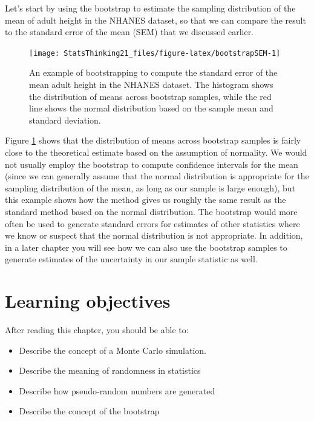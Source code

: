 \documentclass[12pt,]{book}
\providecommand{\tightlist}{%
  \setlength{\itemsep}{0pt}\setlength{\parskip}{0pt}}
\theoremstyle{definition}
\theoremstyle{definition}
\theoremstyle{definition}
\theoremstyle{remark}
\begin{document}
Let's start by using the bootstrap to estimate the sampling distribution of the mean of adult height in the NHANES dataset, so that we can compare the result to the standard error of the mean (SEM) that we discussed earlier.

\begin{figure}
\texttt{[image: StatsThinking21\_files/figure-latex/bootstrapSEM-1]} \caption{An example of bootstrapping to compute the standard error of the mean adult height in the NHANES dataset. The histogram shows the distribution of means across bootstrap samples, while the red line shows the normal distribution based on the sample mean and standard deviation.}\label{fig:bootstrapSEM}
\end{figure}

Figure \ref{fig:bootstrapSEM} shows that the distribution of means across bootstrap samples is fairly close to the theoretical estimate based on the assumption of normality. We would not usually employ the bootstrap to compute confidence intervals for the mean (since we can generally assume that the normal distribution is appropriate for the sampling distribution of the mean, as long as our sample is large enough), but this example shows how the method gives us roughly the same result as the standard method based on the normal distribution. The bootstrap would more often be used to generate standard errors for estimates of other statistics where we know or suspect that the normal distribution is not appropriate. In addition, in a later chapter you will see how we can also use the bootstrap samples to generate estimates of the uncertainty in our sample statistic as well.

\hypertarget{learning-objectives-7}{%
\section{Learning objectives}\label{learning-objectives-7}}

After reading this chapter, you should be able to:

\begin{itemize}
\tightlist
\item
  Describe the concept of a Monte Carlo simulation.
\item
  Describe the meaning of randomness in statistics
\item
  Describe how pseudo-random numbers are generated
\item
  Describe the concept of the bootstrap
\end{itemize}
\end{document}
